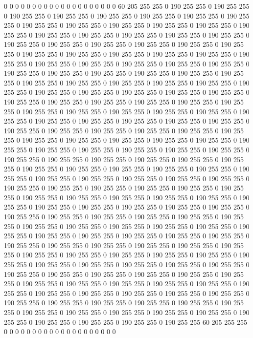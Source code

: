 0 0 0 0 0 0 0 0 0 0 0 0 0 0 0 0 0 0 0 0 60 205 255 255 0 190 255 255 0 190 255 255 0 190 255 255 0 190 255 255 0 190 255 255 0 190 255 255 0 190 255 255 0 190 255 255 0 190 255 255 0 190 255 255 0 190 255 255 0 190 255 255 0 190 255 255 0 190 255 255 0 190 255 255 0 190 255 255 0 190 255 255 0 190 255 255 0 190 255 255 0 190 255 255 0 190 255 255 0 190 255 255 0 190 255 255 0 190 255 255 0 190 255 255 0 190 255 255 0 190 255 255 0 190 255 255 0 190 255 255 0 190 255 255 0 190 255 255 0 190 255 255 0 190 255 255 0 190 255 255 0 190 255 255 0 190 255 255 0 190 255 255 0 190 255 255 0 190 255 255 0 190 255 255 0 190 255 255 0 190 255 255 0 190 255 255 0 190 255 255 
0 190 255 255 0 190 255 255 0 190 255 255 0 190 255 255 0 190 255 255 0 190 255 255 0 190 255 255 0 190 255 255 0 190 255 255 0 190 255 255 0 190 255 255 0 190 255 255 0 190 255 255 0 190 255 255 0 190 255 255 0 190 255 255 0 190 255 255 0 190 255 255 0 190 255 255 0 190 255 255 0 190 255 255 0 190 255 255 0 190 255 255 0 190 255 255 0 190 255 255 0 190 255 255 0 190 255 255 0 190 255 255 0 190 255 255 0 190 255 255 0 190 255 255 0 190 255 255 0 190 255 255 0 190 255 255 0 190 255 255 0 190 255 255 0 190 255 255 0 190 255 255 0 190 255 255 0 190 255 255 0 190 255 255 0 190 255 255 0 190 255 255 0 190 255 255 0 190 255 255 0 190 255 255 0 190 255 255 0 190 255 255 0 190 255 255 0 190 255 255 
0 190 255 255 0 190 255 255 0 190 255 255 0 190 255 255 0 190 255 255 0 190 255 255 0 190 255 255 0 190 255 255 0 190 255 255 0 190 255 255 0 190 255 255 0 190 255 255 0 190 255 255 0 190 255 255 0 190 255 255 0 190 255 255 0 190 255 255 0 190 255 255 0 190 255 255 0 190 255 255 0 190 255 255 0 190 255 255 0 190 255 255 0 190 255 255 0 190 255 255 0 190 255 255 0 190 255 255 0 190 255 255 0 190 255 255 0 190 255 255 0 190 255 255 0 190 255 255 0 190 255 255 0 190 255 255 0 190 255 255 0 190 255 255 0 190 255 255 0 190 255 255 0 190 255 255 0 190 255 255 0 190 255 255 0 190 255 255 0 190 255 255 0 190 255 255 0 190 255 255 0 190 255 255 0 190 255 255 0 190 255 255 0 190 255 255 0 190 255 255 
0 190 255 255 0 190 255 255 0 190 255 255 0 190 255 255 0 190 255 255 0 190 255 255 0 190 255 255 0 190 255 255 0 190 255 255 0 190 255 255 0 190 255 255 0 190 255 255 0 190 255 255 0 190 255 255 0 190 255 255 0 190 255 255 0 190 255 255 0 190 255 255 0 190 255 255 0 190 255 255 0 190 255 255 0 190 255 255 0 190 255 255 0 190 255 255 0 190 255 255 0 190 255 255 0 190 255 255 0 190 255 255 0 190 255 255 0 190 255 255 0 190 255 255 0 190 255 255 0 190 255 255 0 190 255 255 0 190 255 255 0 190 255 255 0 190 255 255 0 190 255 255 0 190 255 255 0 190 255 255 0 190 255 255 0 190 255 255 0 190 255 255 0 190 255 255 60 205 255 255 0 0 0 0 0 0 0 0 0 0 0 0 0 0 0 0 0 0 0 0 
